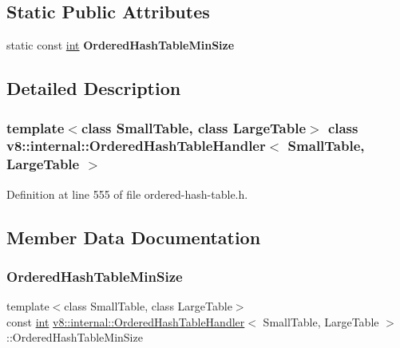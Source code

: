 \subsection*{Static Public Attributes}
\begin{DoxyCompactItemize}
\item 
static const \mbox{\hyperlink{classint}{int}} {\bfseries Ordered\+Hash\+Table\+Min\+Size}
\end{DoxyCompactItemize}


\subsection{Detailed Description}
\subsubsection*{template$<$class Small\+Table, class Large\+Table$>$\newline
class v8\+::internal\+::\+Ordered\+Hash\+Table\+Handler$<$ Small\+Table, Large\+Table $>$}



Definition at line 555 of file ordered-\/hash-\/table.\+h.



\subsection{Member Data Documentation}
\mbox{\label{classv8_1_1internal_1_1OrderedHashTableHandler_a2d8edaa2c12e9c28806557653ce1562e}} 
\subsubsection{\texorpdfstring{Ordered\+Hash\+Table\+Min\+Size}{OrderedHashTableMinSize}}
{\footnotesize\ttfamily template$<$class Small\+Table, class Large\+Table$>$ \\
const \mbox{\hyperlink{classint}{int}} \mbox{\hyperlink{classv8_1_1internal_1_1OrderedHashTableHandler}{v8\+::internal\+::\+Ordered\+Hash\+Table\+Handler}}$<$ Small\+Table, Large\+Table $>$\+::Ordered\+Hash\+Table\+Min\+Size\hspace{0.3cm}{\ttfamily [static]}}

